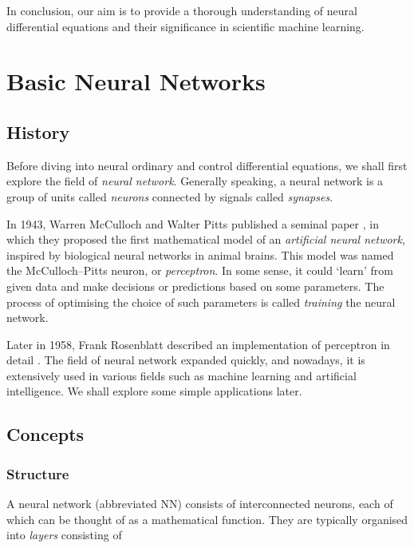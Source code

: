 \documentclass[a4paper,11pt,titlepage]{article}
\theoremstyle{definition}
\theoremstyle{plain}
\theoremstyle{remark}
\begin{document}
In conclusion, our aim is to provide a thorough understanding of neural differential equations and their significance in scientific machine learning.

\pagebreak
\section{Basic Neural Networks}

\label{sec:neuralnetworks}
\subsection{History}

Before diving into neural ordinary and control differential equations, we shall first explore the field of \textit{neural network}. Generally speaking, a neural network is a group of units called \textit{neurons} connected by signals called \textit{synapses}.

In 1943, Warren McCulloch and Walter Pitts published a seminal paper \cite{McCulloch1943}, in which they proposed the first mathematical model of an \textit{artificial neural network}, inspired by biological neural networks in animal brains. This model was named the McCulloch–Pitts neuron, or \textit{perceptron}. In some sense, it could ‘learn’ from given data and make decisions or predictions based on some parameters. The process of optimising the choice of such parameters is called \textit{training} the neural network.

Later in 1958, Frank Rosenblatt described an implementation of perceptron in detail \cite{Rosenblatt1958}. The field of neural network expanded quickly, and nowadays, it is extensively used in various fields such as machine learning and artificial intelligence. We shall explore some simple applications later.

\subsection{Concepts}

\subsubsection{Structure}

 A neural network (abbreviated NN) consists of interconnected neurons, each of which can be thought of as a mathematical function. They are typically organised into \textit{layers} consisting of
\end{document}
